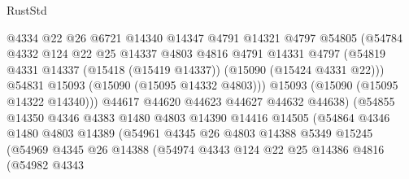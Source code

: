 \begin{lexlean}{RustStd}
\begin{coremodule}
                            @4334
                            @22
                            @26
                            @6721
                            @14340
                            @14347
                            @4791
                            @14321
                            @4797
                            @54805
                            (@54784
                              @4332
                              @124
                              @22
                              @25
                              @14337
                              @4803
                              @4816
                              @4791
                              @14331
                              @4797
                              (@54819
                                @4331
                                @14337
                                (@15418 (@15419 @14337))
                                (@15090 (@15424 @4331 @22)))
                              @54831
                              @15093
                              (@15090 (@15095 @14332 @4803)))
                            @15093
                            (@15090 (@15095 @14322 @14340)))
                          @44617
                          @44620
                          @44623
                          @44627
                          @44632
                          @44638)
                        (@54855
                          @14350
                          @4346
                          @4383
                          @1480
                          @4803
                          @14390
                          @14416
                          @14505
                          (@54864
                            @4346
                            @1480
                            @4803
                            @14389
                            (@54961
                              @4345
                              @26
                              @4803
                              @14388
                              @5349
                              @15245
                              (@54969
                                @4345
                                @26
                                @14388
                                (@54974
                                  @4343
                                  @124
                                  @22
                                  @25
                                  @14386
                                  @4816
                                  (@54982
                                    @4343

\end{coremodule}
\end{lexlean}
